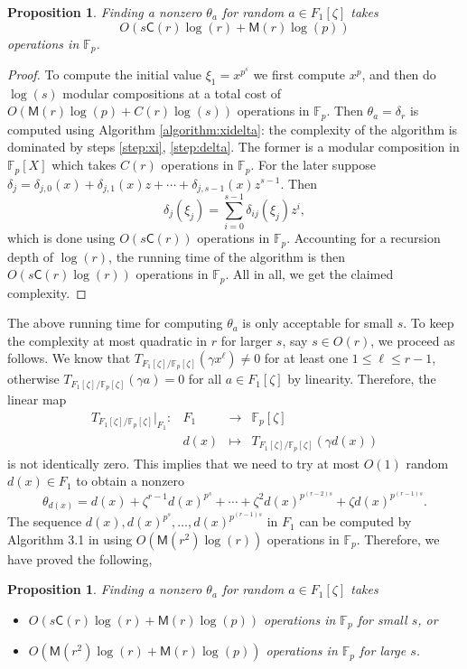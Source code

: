 \documentclass[12pt]{article}
\theoremstyle{plain}
\newtheorem{proposition}[theorem]{Proposition}
\theoremstyle{definition}
\def\F{\ensuremath{\mathbb{F}}}
\def\MM{\ensuremath{\mathsf{M}}}
\def\CC{\ensuremath{\mathsf{C}}}
\newcounter{algorithm}
\begin{document}
\begin{proposition}
	\label{proposition:XiDelta}
	Finding a nonzero $\theta_a$ for random $a \in F_1[\zeta]$ takes \[O(s\CC(r)\log(r) + 
	\MM(r)\log(p))\] operations in $\F_p$.
\end{proposition}
\begin{proof}
	To compute the initial value $\xi_1 = x^{p^s}$ we first compute $x^p$, and then do $\log(s)$ 
	modular compositions at a total cost of $O(\MM(r)\log(p) + C(r)\log(s))$ operations in $\F_p$. 
	Then $\theta_a = \delta_r$ is computed using Algorithm \ref{algorithm:xidelta}: the complexity 
	of the algorithm is dominated by steps \ref{step:xi}, \ref{step:delta}. The former is a
	modular composition in $\F_p[X]$ which takes $C(r)$ operations in $\F_p$. For the later suppose 
	$\delta_j = \delta_{j,0}(x) + \delta_{j,1}(x)z + \cdots + \delta_{j,s - 1}(x)z^{s - 1}$. Then   
	\[ \delta_j(\xi_j) = \sum_{i = 0}^{s - 1}\delta_{ij}(\xi_j)z^i, \] which is done using 
	$O(s\CC(r))$ operations in $\F_p$. Accounting for a recursion depth of $\log(r)$, the running 
	time of the algorithm is then $O(s\CC(r)\log(r))$ operations in $\F_p$. All in all, we get the 
	claimed 
	complexity.
\end{proof}
The above running time for computing $\theta_a$ is only acceptable for small $s$. To keep the 
complexity at most quadratic in $r$ for larger $s$, say $s \in O(r)$, we proceed as follows. We 
know that $T_{F_1[\zeta] / \F_p[\zeta]}(\gamma x^\ell) \ne 0$ for at least one $1 \le \ell \le r - 
1$, otherwise $T_{F_1[\zeta] / \F_p[\zeta]}(\gamma a) = 0$ for all $a \in F_1[\zeta]$ by linearity.
Therefore, the linear map 
\[
\begin{array}{rrll}
	T_{F_1[\zeta] / \F_p[\zeta]}\vert_{F_1}: & F_1 & \longrightarrow & \F_p[\zeta] \\
	& d(x) & \longmapsto & T_{F_1[\zeta] / \F_p[\zeta]}(\gamma d(x))
\end{array}
\]
is not identically zero. This implies that we need to try at most $O(1)$ random $d(x) \in F_1$ to 
obtain a nonzero
\[ \theta_{d(x)} = d(x) + \zeta^{r - 1}d(x)^{p^s} + \cdots + \zeta^2d(x)^{p^{(r - 2)s}} + \zeta 
d(x)^{p^{(r - 1)s}}. \]
The sequence $d(x), d(x)^{p^s}, \dots, d(x)^{p^{(r - 1)s}}$ in $F_1$ can be computed by Algorithm 
3.1 in \cite{von1992computing} using $O(\MM(r^2)\log(r))$ operations in $\F_p$. Therefore, we have 
proved the following,
\begin{proposition}
	\label{proposition:XiDelta-updated}
	Finding a nonzero $\theta_a$ for random $a \in F_1[\zeta]$ takes
	\begin{itemize}
		\item $O(s\CC(r)\log(r) + \MM(r)\log(p))$ operations in $\F_p$ for small $s$, or
		\item $O(\MM(r^2)\log(r) + \MM(r)\log(p))$ operations in $\F_p$ for large $s$.
	\end{itemize}
\end{proposition}
\end{document}

